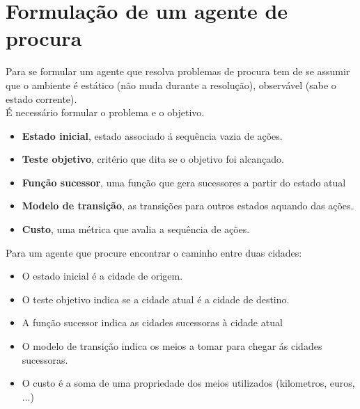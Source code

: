 \documentclass[]{report}
\begin{document}
\section{Formulação de um agente de procura}
Para se formular um agente que resolva problemas de procura tem de se assumir que o ambiente é estático (não muda durante a resolução), observável (sabe o estado corrente).\\[2mm]
É necessário formular o problema e o objetivo.
\begin{itemize}
	\item \textbf{Estado inicial}, estado associado á sequência vazia de ações.
	\item \textbf{Teste objetivo}, critério que dita se o objetivo foi alcançado.
	\item \textbf{Função sucessor}, uma função que gera sucessores a partir do estado atual
	\item \textbf{Modelo de transição}, as transições para outros estados aquando das ações.
	\item \textbf{Custo}, uma métrica que avalia a sequência de ações.
\end{itemize}
Para um agente que procure encontrar o caminho entre duas cidades:
\begin{itemize}
	\item O estado inicial é a cidade de origem.
	\item O teste objetivo indica se a cidade atual é a cidade de destino.
	\item A função sucessor indica as cidades sucessoras à cidade atual
	\item O modelo de transição indica os meios a tomar para chegar ás cidades sucessoras.
	\item O custo é a soma de uma propriedade dos meios utilizados (kilometros, euros, ...)
\end{itemize}
\clearpage
\end{document}
